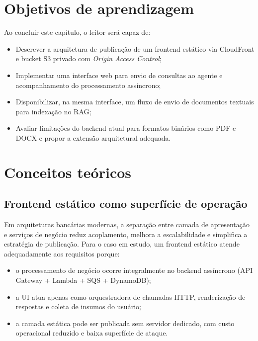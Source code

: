 \section{Objetivos de aprendizagem}

Ao concluir este cap\'itulo, o leitor ser\'a capaz de:

\begin{itemize}[leftmargin=*]
  \item Descrever a arquitetura de publica\c{c}\~ao de um frontend
        est\'atico via CloudFront e bucket S3 privado com
        \textit{Origin Access Control};
  \item Implementar uma interface web para envio de consultas ao agente
        e acompanhamento do processamento ass\'incrono;
  \item Disponibilizar, na mesma interface, um fluxo de envio de
        documentos textuais para indexa\c{c}\~ao no RAG;
  \item Avaliar limita\c{c}\~oes do backend atual para formatos bin\'arios
        como PDF e DOCX e propor a extens\~ao arquitetural adequada.
\end{itemize}

\section{Conceitos te\'oricos}

\subsection{Frontend est\'atico como superf\'icie de opera\c{c}\~ao}

Em arquiteturas banc\'arias modernas, a separa\c{c}\~ao entre camada de
apresenta\c{c}\~ao e servi\c{c}os de neg\'ocio reduz acoplamento, melhora a
escalabilidade e simplifica a estrat\'egia de publica\c{c}\~ao. Para o caso
em estudo, um frontend est\'atico atende adequadamente aos requisitos
porque:

\begin{itemize}[leftmargin=*]
  \item o processamento de neg\'ocio ocorre integralmente no backend
        ass\'incrono (API Gateway + Lambda + SQS + DynamoDB);
  \item a UI atua apenas como orquestradora de chamadas HTTP,
        renderiza\c{c}\~ao de respostas e coleta de insumos do usu\'ario;
  \item a camada est\'atica pode ser publicada sem servidor dedicado,
        com custo operacional reduzido e baixa superf\'icie de ataque.
\end{itemize}

